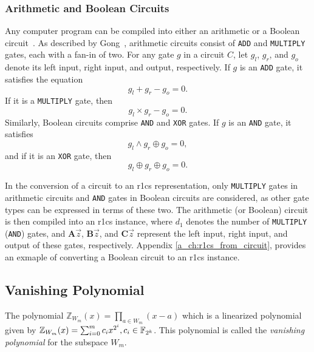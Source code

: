 \subsubsection{Arithmetic and Boolean Circuits}
Any computer program can be compiled into either an arithmetic or a Boolean circuit~\cite{Parno2016Pinocchio}. As described by Gong~\cite{Gong2024}, arithmetic circuits consist of \texttt{ADD} and \texttt{MULTIPLY} gates, each with a fan-in of two. For any gate $g$ in a circuit $C$, let $g_l$, $g_r$, and $g_o$ denote its left input, right input, and output, respectively. If $g$ is an \texttt{ADD} gate, it satisfies the equation 
\[
g_l + g_r - g_o = 0.
\]
If it is a \texttt{MULTIPLY} gate, then 
\[
g_l \times g_r - g_o = 0.
\]
Similarly, Boolean circuits comprise \texttt{AND} and \texttt{XOR} gates. If $g$ is an \texttt{AND} gate, it satisfies
\[
g_l \wedge g_r \oplus g_o = 0,
\]
and if it is an \texttt{XOR} gate, then 
\[
g_l \oplus g_r \oplus g_o = 0.
\]


In the conversion of a circuit to an \gls{r1cs} representation, only \texttt{MULTIPLY} gates in arithmetic circuits and \texttt{AND} gates in Boolean circuits are considered, as other gate types can be expressed in terms of these two. The arithmetic (or Boolean) circuit is then compiled into an \gls{r1cs} instance, where $d_1$ denotes the number of \texttt{MULTIPLY} (\texttt{AND}) gates, and $\mathbf{A} \vec{z}$, $\mathbf{B} \vec{z}$, and $\mathbf{C} \vec{z}$ represent the left input, right input, and output of these gates, respectively. Appendix \ref{a_ch:r1cs_from_circuit}, provides an exmaple of converting a Boolean circuit to an \gls{r1cs}  instance.







\subsection{Vanishing Polynomial}
\begin{definition}
	The polynomial $\mathbb{Z}_{W_{m}}(x)= \prod_{a\in W_m}^{} (x-a)$ which is a linearized polynomial given by $\mathbb{Z}_{W_{m}}(x) = \sum_{i=0}^{m} c_i x^{2^i}, c_i \in {\mathbb F}_{2^k}$. This polynomial is called the \textit{vanishing polynomial} for the subspace $W_m$.
\end{definition}

